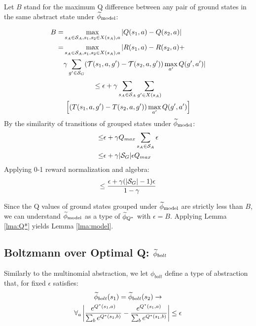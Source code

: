 Let $B$ stand for the maximum Q difference between any pair of ground states in the same abstract state under $\widetilde \phi_{\text{model}}$:

\begin{align*}
B = &\max_{s_A \in \mathcal{S}_A, s_1, s_2 \in X(s_A), a} |Q(s_1, a) - Q(s_2, a)|\\
=&\max_{s_A \in \mathcal{S}_A, s_1, s_2 \in X(s_A), a}      |R(s_1, a) - R(s_2, a) +\\
& \gamma \sum_{g' \in \mathcal{S}_G}(\mathcal{T}(s_1,a,g')-\mathcal{T}(s_2, a, g'))\max_{a'}Q(g', a')|
\end{align*}
\begin{multline*}
\leq \epsilon + \gamma \sum_{s_A \in \mathcal{S}_A}\sum_{g' \in X(s_A)} \\ \left[(T(s_1, a, g')-T(s_2, a, g')) 		\max_{a'}Q(g', a')	\right]
\end{multline*}
By the similarity of transitions of grouped states under $\widetilde \phi_{\text{model}}$:
\begin{align*}
 \leq &\epsilon + \gamma Q_{max} \sum_{s_A \in \mathcal{S}_A} \epsilon \\
\leq& \epsilon + \gamma|\mathcal{S}_G|\epsilon Q_{max}
\end{align*}
Applying 0-1 reward normalization and algebra:
\begin{equation*}
 \leq \frac{\epsilon + \gamma(|\mathcal{S}_G| - 1) \epsilon}{1-\gamma}
\end{equation*}

Since the Q values of ground states grouped under $\widetilde \phi_{\text{model}}$ are strictly less than $B$, we can understand $\widetilde \phi_{\text{model}}$ as a type of $\widetilde \phi_{Q^*}$ with $\epsilon = B$. Applying Lemma \ref{lma:Q*} yields Lemma \ref{lma:model}.


\subsection{Boltzmann over Optimal Q: $\widetilde \phi_{bolt}$}
\label{sec:boltz}


Similarly to the multinomial abstraction, we let $\phi_{bolt}$ define a type of abstraction that, for fixed $\epsilon$ satisfies:
\begin{multline}
\widetilde \phi_{bolt}(s_1) = \widetilde \phi_{bolt}(s_2) \rightarrow \\
\forall_{a} \left|\frac{e^{Q^*(s_1,a)}}{\sum_b e^{Q^*(s_1,b)}} - \frac{e^{Q^*(s_1,a)}}{\sum_b e^{Q^*(s_1,b)}}\right| \leq \epsilon
\end{multline}

